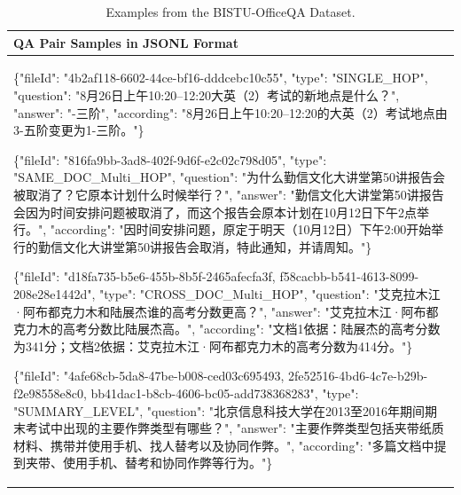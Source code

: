 \begin{table}[!htbp]
\centering
\footnotesize

\begin{tabular}{p{}}
\toprule
\textbf{QA Pair Samples in JSONL Format} \\
\midrule

\begin{minipage}[t]{0.92\textwidth}
\raggedright
\sloppy

\ttfamily
\{"fileId": "4b2af118-6602-44ce-bf16-dddcebc10c55",
"type": "SINGLE\_HOP",
"question": "\normalfont 8月26日上午10:20--12:20大英（2）考试的新地点是什么？\ttfamily",
"answer": "\normalfont 1-三阶\ttfamily",
"according": "\normalfont 8月26日上午10:20--12:20的大英（2）考试地点由3-五阶变更为1-三阶。\ttfamily"\}
\par

\medskip

\{"fileId": "816fa9bb-3ad8-402f-9d6f-e2c02c798d05",
"type": "SAME\_DOC\_Multi\_HOP",
"question": "\normalfont 为什么勤信文化大讲堂第50讲报告会被取消了？它原本计划什么时候举行？\ttfamily",
"answer": "\normalfont 勤信文化大讲堂第50讲报告会因为时间安排问题被取消了，而这个报告会原本计划在10月12日下午2点举行。\ttfamily",
"according": "\normalfont 因时间安排问题，原定于明天（10月12日）下午2:00开始举行的勤信文化大讲堂第50讲报告会取消，特此通知，并请周知。\ttfamily"\}
\par

\medskip

\{"fileId": "d18fa735-b5e6-455b-8b5f-2465afecfa3f,\allowbreak
f58cacbb-b541-4613-8099-208e28e1442d",
"type": "CROSS\_DOC\_Multi\_HOP",
"question": "\normalfont 艾克拉木江·阿布都克力木和陆展杰谁的高考分数更高？\ttfamily",
"answer": "\normalfont 艾克拉木江·阿布都克力木的高考分数比陆展杰高。\ttfamily",
"according": "\normalfont 文档1依据：陆展杰的高考分数为341分；文档2依据：艾克拉木江·阿布都克力木的高考分数为414分。\ttfamily"\}
\par

\medskip

\{"fileId": "4afe68cb-5da8-47be-b008-ced03c695493,\allowbreak
2fe52516-4bd6-4c7e-b29b-f2e98558e8c0,\allowbreak
bb41dac1-b8cb-4606-bc05-add738368283",
"type": "SUMMARY\_LEVEL",
"question": "\normalfont 北京信息科技大学在2013至2016年期间期末考试中出现的主要作弊类型有哪些？\ttfamily",
"answer": "\normalfont 主要作弊类型包括夹带纸质材料、携带并使用手机、找人替考以及协同作弊。\ttfamily",
"according": "\normalfont 多篇文档中提到夹带、使用手机、替考和协同作弊等行为。\ttfamily"\}

\normalfont

\end{minipage}

\\
\bottomrule
\end{tabular}

\caption{Examples from the BISTU-OfficeQA Dataset.}
\label{tab:dataset-examples}

\end{table}